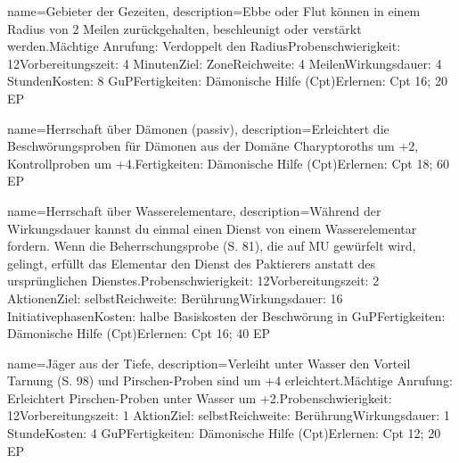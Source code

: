 {
    name={Gebieter der Gezeiten},
    description={Ebbe oder Flut können in einem Radius von 2 Meilen zurückgehalten, beschleunigt oder verstärkt werden.\newline Mächtige Anrufung: Verdoppelt den Radius\newline Probenschwierigkeit: 12\newline Vorbereitungszeit: 4 Minuten\newline Ziel: Zone\newline Reichweite: 4 Meilen\newline Wirkungsdauer: 4 Stunden\newline Kosten: 8 GuP\newline Fertigkeiten: Dämonische Hilfe (Cpt)\newline Erlernen: Cpt 16; 20 EP}
}


{
    name={Herrschaft über Dämonen (passiv)},
    description={Erleichtert die Beschwörungsproben für Dämonen aus der Domäne Charyptoroths um +2, Kontrollproben um +4.\newline Fertigkeiten: Dämonische Hilfe (Cpt)\newline Erlernen: Cpt 18; 60 EP}
}


{
    name={Herrschaft über Wasserelementare},
    description={Während der Wirkungsdauer kannst du einmal einen Dienst von einem Wasserelementar fordern. Wenn die Beherrschungsprobe (S. 81), die auf MU gewürfelt wird, gelingt, erfüllt das Elementar den Dienst des Paktierers anstatt des ursprünglichen Dienstes.\newline Probenschwierigkeit: 12\newline Vorbereitungszeit: 2 Aktionen\newline Ziel: selbst\newline Reichweite: Berührung\newline Wirkungsdauer: 16 Initiativephasen\newline Kosten: halbe Basiskosten der Beschwörung in GuP\newline Fertigkeiten: Dämonische Hilfe (Cpt)\newline Erlernen: Cpt 16; 40 EP}
}


{
    name={Jäger aus der Tiefe},
    description={Verleiht unter Wasser den Vorteil Tarnung (S. 98) und Pirschen-Proben sind um +4 erleichtert.\newline Mächtige Anrufung: Erleichtert Pirschen-Proben unter Wasser um +2.\newline Probenschwierigkeit: 12\newline Vorbereitungszeit: 1 Aktion\newline Ziel: selbst\newline Reichweite: Berührung\newline Wirkungsdauer: 1 Stunde\newline Kosten: 4 GuP\newline Fertigkeiten: Dämonische Hilfe (Cpt)\newline Erlernen: Cpt 12; 20 EP}
}


